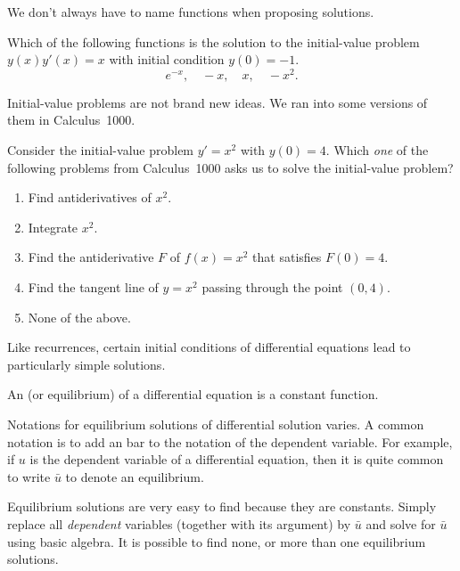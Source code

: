 \documentclass[../main.tex]{subfiles}
\begin{document}
We don't always have to name functions when proposing solutions.
\begin{example}
  Which of the following functions is the solution to the initial-value problem \(y(x)y'(x) = x\) with initial condition \(y(0) = -1\).
  \[
    e^{-x}, \quad -x, \quad x, \quad -x^{2}.
  \]
\end{example}

Initial-value problems are not brand new ideas. We ran into some versions of them in Calculus~1000.
\begin{example}
  Consider the initial-value problem \(y' = x^{2}\) with \(y(0) = 4\).  Which \emph{one} of the following problems from Calculus~1000 asks us to solve the initial-value problem?

  \begin{enumerate}[label=(\alph*)]
    \item Find antiderivatives of \(x^{2}\).
    \item Integrate \(x^{2}\).
    \item Find the antiderivative \(F\) of \(f(x) = x^{2}\) that satisfies \(F(0) = 4\).
    \item Find the tangent line of \(y = x^{2}\) passing through the point \((0,4)\).
    \item None of the above.
  \end{enumerate}
\end{example}
\clearpage

Like recurrences, certain initial conditions of differential equations lead to particularly simple solutions. 

\begin{definition}
  An  (or equilibrium) of a differential equation is a constant function.  
\end{definition}

Notations for equilibrium solutions of differential solution varies. A common notation is to add an bar to the notation of the dependent variable. For example, if \(u\) is the dependent variable of a differential equation, then it is quite common to write \(\bar{u}\) to denote an equilibrium. 

\faStar{} Equilibrium solutions are very easy to find because they are constants. Simply replace all \emph{dependent} variables (together with its argument) by \(\bar{u}\) and solve for \(\bar{u}\) using basic algebra. It is possible to find none, or more than one equilibrium solutions.
\end{document}

